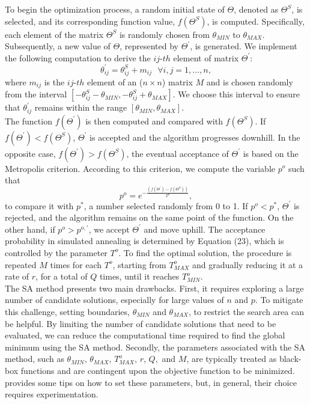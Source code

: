 \documentclass[<1p>]{elsarticle} %
\begin{document}
\indent To begin the optimization process, a random initial state of $\Theta$, denoted as $\Theta^{S}$, is selected, and its corresponding function value, $f(\Theta^{S})$, is computed. Specifically, each element of the matrix $\Theta^{S}$ is randomly chosen from $\theta_{MIN}$ to $\theta_{MAX}$. Subsequently, a new value of $\Theta$, represented by $\Theta^{\prime}$, is generated. We implement the following computation to derive the $ij$-$th$ element of matrix $\Theta^{\prime}$:
\begin{equation}
\theta^{\prime}_{ij}=\theta^{S}_{ij} + m_{ij} \ \ \ \forall i,j=1, \dots, n,
\end{equation}
where $m_{ij}$ is the $ij$-$th$ element of an ($n\times n$) matrix $M$ and is chosen randomly from the interval $[-\theta^{S}_{ij} - \theta_{MIN}, -\theta^{S}_{ij}+\theta_{MAX}]$. We choose this interval to ensure that $\theta^{\prime}_{ij} $ remains within the range $[\theta_{MIN}, \theta_{MAX}]$.\\
\indent The function $f(\Theta^{\prime})$ is then computed and compared with $f(\Theta^{S})$. If $f(\Theta^{\prime})<f(\Theta^{S})$, $\Theta^{\prime}$ is accepted and the algorithm progresses downhill. In the opposite case, $f(\Theta^{\prime})>f(\Theta^{S})$, the eventual acceptance of $\Theta^{\prime}$ is based on the Metropolis criterion. According to this criterion, we compute the variable $p^o$ such that
\begin{equation}
    p^o=e^{-\frac{(f(\Theta^{\prime})-f(\Theta^S))}{T^{o}}},
\end{equation}
to compare it with $p^{*}$, a number selected randomly from 0 to 1. If $p^o < p^{*}$, $\Theta^{\prime}$ is rejected, and the algorithm remains on the same point of the function. On the other hand, if $p^o > p^{o,\prime}$, we accept $\Theta^{\prime}$ and move uphill. The acceptance probability in simulated annealing is determined by Equation (23), which is controlled by the parameter $T^o$. To find the optimal solution, the procedure is repeated $M$ times for each $T^{o}$, starting from $T^{o}_{MAX}$ and gradually reducing it at a rate of $r$, for a total of $Q$ times, until it reaches $T^{o}_{MIN}$.\\
\indent The SA method presents two main drawbacks. First, it requires exploring a large number of candidate solutions, especially for large values of $n$ and $p$. To mitigate this challenge, setting boundaries, $\theta_{MIN}$ and $\theta_{MAX}$, to restrict the search area can be helpful. By limiting the number of candidate solutions that need to be evaluated, we can reduce the computational time required to find the global minimum using the SA method. Secondly, the parameters associated with the SA method, such as $\theta_{MIN}$, $\theta_{MAX}$, $T^{o}_{MAX}$, $r$, $Q,$ and $M$, are typically treated as black-box functions and are contingent upon the objective function to be minimized. \cite{goffe1994global} provides some tips on how to set these parameters, but, in general, their choice requires experimentation.\\
\end{document}
